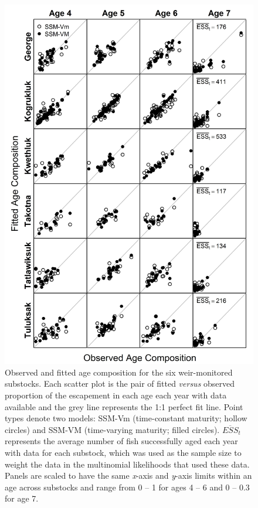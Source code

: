 \documentclass[12pt,]{book}
\theoremstyle{definition}
\theoremstyle{definition}
\theoremstyle{definition}
\theoremstyle{remark}
\begin{document}
\clearpage

\begin{figure}
  \centering
  \includegraphics{img/Ch4/age-fit.jpg}
  \caption{Observed and fitted age composition for the six weir-monitored substocks. Each scatter plot is the pair of fitted \textit{versus} observed proportion of the escapement in each age each year with data available and the grey line represents the 1:1 perfect fit line. Point types denote two models: SSM-Vm (time-constant maturity; hollow circles) and SSM-VM (time-varying maturity; filled circles). $\overline{ESS}_t$ represents the average number of fish successfully aged each year with data for each substock, which was used as the sample size to weight the data in the multinomial likelihoods that used these data. Panels are scaled to have the same \textit{x}-axis and \textit{y}-axis limits within an age across substocks and range from 0 -- 1 for ages 4 -- 6 and 0 -- 0.3 for age 7.}
  \label{fig:age-fit}
\end{figure}
\end{document}
